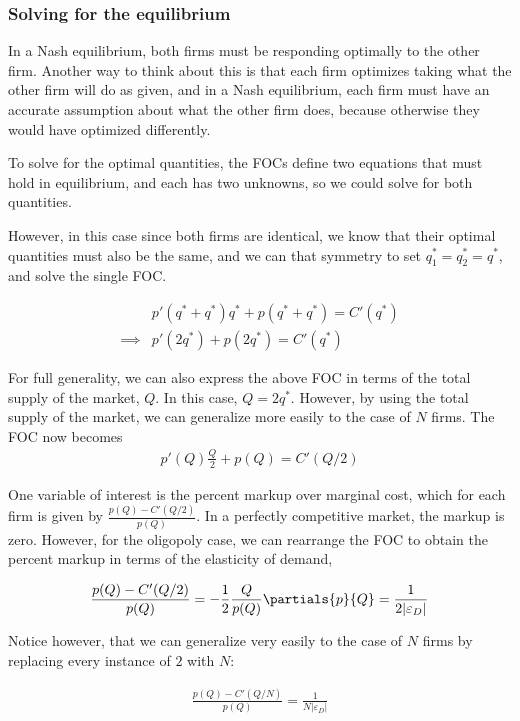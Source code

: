 \subsubsection*{Solving for the equilibrium}
In a Nash equilibrium, both firms must be responding optimally to the other firm. Another way to think about this is that each firm optimizes taking what the other firm will do as given, and in a Nash equilibrium, each firm must have an accurate assumption about what the other firm does, because otherwise they would have optimized differently.

To solve for the optimal quantities, the FOCs define two equations that must hold in equilibrium, and each has two unknowns, so we could solve for both quantities. 

However, in this case since both firms are identical, we know that their optimal quantities must also be the same, and we can that symmetry to set $q_1^* = q_2^* = q^*$, and solve the single FOC. 

\begin{align*}
    &p'(q^* + q^*)q^* + p(q^* + q^*) = C'(q^*) \\ 
    \implies& p'(2q^*) + p(2q^*) = C'(q^*)
\end{align*}

For full generality, we can also express the above FOC in terms of the total supply of the market, $Q$. In this case, $Q = 2q^*$. However, by using the total supply of the market, we can generalize more easily to the case of $N$ firms. The FOC now becomes
\begin{align*}
    p'(Q)\frac{Q}{2} + p(Q) = C'(Q/2)
\end{align*}

One variable of interest is the percent markup over marginal cost, which for each firm is given by $\frac{p(Q) - C'(Q/2)}{p(Q)}$. In a perfectly competitive market, the markup is zero. However, for the oligopoly case, we can rearrange the FOC to obtain the percent markup in terms of the elasticity of demand,

\begin{align*}
    \frac{p(Q) - C'(Q/2)}{p(Q)} = -\frac{1}{2} \frac{Q}{p(Q)} \partials{p}{Q} = \frac{1}{2|\varepsilon_D|}
\end{align*}

Notice however, that we can generalize very easily to the case of $N$ firms by replacing every instance of $2$ with $N$:

\begin{align*}
    \frac{p(Q) - C'(Q/N)}{p(Q)} = \frac{1}{N|\varepsilon_D|}
\end{align*}

